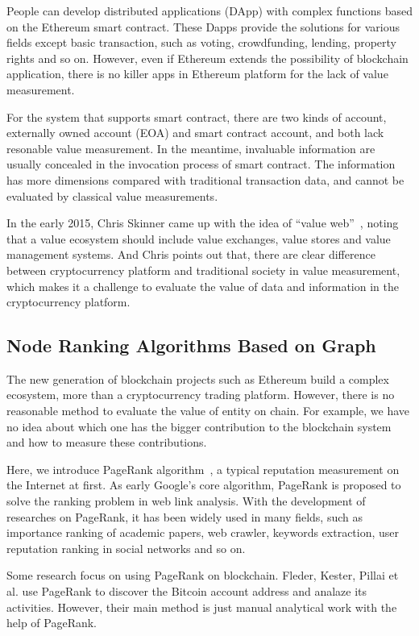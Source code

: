 People can develop distributed applications (DApp) with complex functions based on the Ethereum smart contract. These Dapps provide the solutions for various fields except basic transaction, such as voting, crowdfunding, lending, property rights and so on.
However, even if Ethereum extends the possibility of blockchain application, there is no killer apps in Ethereum platform for the lack of value measurement.

For the system that supports smart contract, there are two kinds of account, externally owned account (EOA) and smart contract account, and both lack resonable value measurement. In the meantime, invaluable information are usually concealed in the invocation process of smart contract. The information has more dimensions compared with traditional transaction data, and cannot be evaluated by classical value measurements.

In the early 2015, Chris Skinner came up with the idea of “value web”~\cite{ChrisSkinner}, noting that a value ecosystem should include value exchanges, value stores and value management systems. And Chris points out that, there are clear difference between cryptocurrency platform and traditional society in value measurement, which makes it a challenge to evaluate the value of data and information in the cryptocurrency platform.

\subsection{Node Ranking Algorithms Based on Graph}
The new generation of blockchain projects such as Ethereum build a complex ecosystem, more than a cryptocurrency trading platform. However, there is no reasonable method to evaluate the value of entity on chain. For example, we have no idea about which one has the bigger contribution to the blockchain system and how to measure these contributions.

Here, we introduce PageRank algorithm~\cite{page1999pagerank}, a typical reputation measurement on the Internet at first. As early Google's core algorithm, PageRank is proposed to solve the ranking problem in web link analysis. With the development of researches on PageRank, it has been widely used in many fields, such as importance ranking of academic papers, web crawler, keywords extraction, user reputation ranking in social networks and so on.

Some research focus on using PageRank on blockchain. Fleder, Kester, Pillai et al. use PageRank to discover the Bitcoin account address and analaze its activities. However, their main method is just manual analytical work with the help of PageRank.

